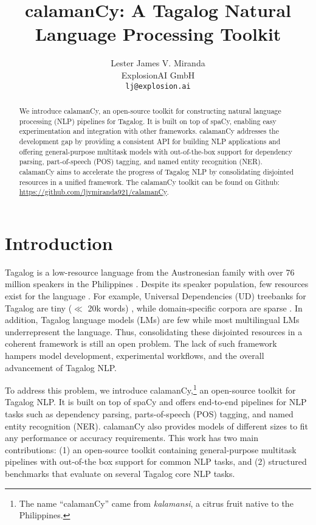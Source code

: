 \documentclass[11pt]{article}
\title{calamanCy: A Tagalog Natural Language Processing Toolkit}
\author{Lester James V. Miranda \\
  ExplosionAI GmbH \\
  \texttt{lj@explosion.ai}}
\begin{document}
\maketitle
\begin{abstract}
  We introduce calamanCy, an open-source toolkit for constructing natural language processing (NLP) pipelines for Tagalog.
  It is built on top of spaCy, enabling easy experimentation and integration with other frameworks.  
  calamanCy addresses the development gap by providing a consistent API for building NLP applications and offering general-purpose multitask models with out-of-the-box support for dependency parsing, part-of-speech (POS) tagging, and named entity recognition (NER).
  calamanCy aims to accelerate the progress of Tagalog NLP by consolidating disjointed resources in a unified framework.
  The calamanCy toolkit can be found on Github: \url{https://github.com/ljvmiranda921/calamanCy}.
\end{abstract}

\section{Introduction}

Tagalog is a low-resource language from the Austronesian family with over 76 million speakers in the Philippines \citep{Lewis2009EthnologueL}.
Despite its speaker population, few resources exist for the language \citep{Cruz2021ImprovingLL}. 
For example, Universal Dependencies (UD) treebanks for Tagalog are tiny ($\ll$ 20k words) \citep{Samson2018TRG,Aquino2020ParsingIT}, 
while domain-specific corpora are sparse \citep{Cabasag2016HatespeechIPLivelo2018IntelligentDI}. 
In addition, Tagalog language models (LMs) \citep{Cruz2021ImprovingLL,Jiang2021PretrainedLM} are few while most multilingual LMs \citep{Conneau2019UnsupervisedCR,Devlin2019BERTPO} underrepresent the language.
Thus, consolidating these disjointed resources in a coherent framework is still an open problem.
The lack of such framework hampers model development, experimental workflows, and the overall advancement of Tagalog NLP.

To address this problem, we introduce calamanCy,\footnote[1]{
  The name ``calamanCy'' came from \textit{kalamansi}, a citrus fruit native to the Philippines.}
an open-source toolkit for Tagalog NLP. 
It is built on top of spaCy \citep{Honnibal2020Spacy} and offers end-to-end pipelines for NLP tasks such as dependency parsing, parts-of-speech (POS) tagging, and named entity recognition (NER). 
calamanCy also provides models of different sizes to fit any performance or accuracy requirements.
This work has two main contributions: (1) an open-source toolkit containing general-purpose multitask pipelines with out-of-the box support for common NLP tasks, and (2) structured benchmarks that evaluate on several Tagalog core NLP tasks.
\end{document}
